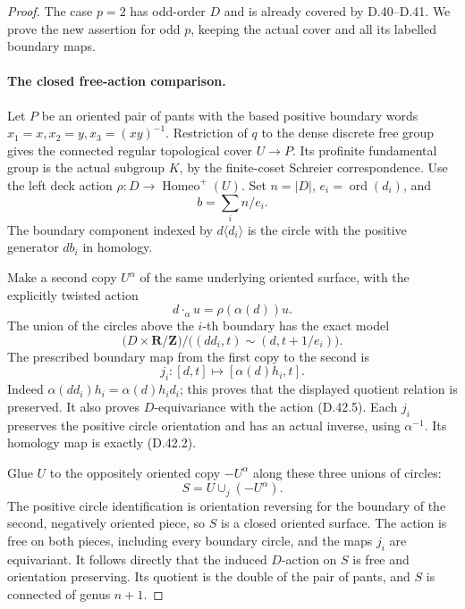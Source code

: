 \begin{proof}
The case \(p=2\) has odd-order \(D\) and is already
covered by D.40--D.41.
We prove the new assertion for odd \(p\), keeping the
actual cover and all its labelled boundary maps.

\paragraph{The closed free-action comparison.}
Let \(P\) be an oriented pair of pants with the based
positive boundary words \(x_1=x,x_2=y,x_3=(xy)^{-1}\).
Restriction of \(q\) to the dense discrete free group
gives the connected regular topological cover
\(U\to P\).
Its profinite fundamental group is the actual subgroup
\(K\), by the finite-coset Schreier correspondence.
Use the left deck action \(\rho:D\to\operatorname{Homeo}^+(U)\).
Set \(n=|D|\), \(e_i=\operatorname{ord}(d_i)\), and
\[
             b=\sum_i n/e_i.
 \tag{D.42.4}
\]
The boundary component indexed by
\(d\langle d_i\rangle\) is the circle with the
positive generator \(d b_i\) in homology.

Make a second copy \(U^\alpha\) of the same underlying
oriented surface, with the explicitly twisted action
\[
                 d\cdot_\alpha u=\rho(\alpha(d))u.
 \tag{D.42.5}
\]
The union of the circles above the \(i\)-th boundary
has the exact model
\[
 \bigl(D\times\mathbf R/\mathbf Z\bigr)\big/
 \bigl((d d_i,t)\sim(d,t+1/e_i)\bigr).
\]
The prescribed boundary map from the first copy to the
second is
\[
          j_i:[d,t]\longmapsto[\alpha(d)h_i,t].
 \tag{D.42.6}
\]
Indeed
\(\alpha(d d_i)h_i=\alpha(d)h_i d_i\);
this proves that the displayed quotient relation is
preserved.  It also proves \(D\)-equivariance with
the action \textup{(D.42.5)}.
Each \(j_i\) preserves the positive circle orientation
and has an actual inverse, using \(\alpha^{-1}\).
Its homology map is exactly \textup{(D.42.2)}.

Glue \(U\) to the oppositely oriented copy
\(-U^\alpha\) along these three unions of circles:
\[
                 S=U\mathbin{\cup_j}(-U^\alpha).
 \tag{D.42.7}
\]
The positive circle identification is orientation
reversing for the boundary of the second, negatively
oriented piece, so \(S\) is a closed oriented surface.
The action is free on both pieces, including every
boundary circle, and the maps \(j_i\) are equivariant.
It follows directly that the induced \(D\)-action on
\(S\) is free and orientation preserving.
Its quotient is the double of the pair of pants,
and \(S\) is connected of genus \(n+1\).


\end{proof}

